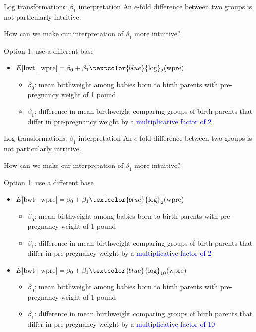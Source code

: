 \documentclass[10pt,t]{beamer}
\begin{document}
\begin{frame}{Log transformations: $\beta_1$ interpretation}
An $e$-fold difference between two groups is not particularly intuitive.

How can we make our interpretation of $\beta_1$ more intuitive?

\vspace{0.3cm}

Option 1: use a different base

\begin{itemize}
	\item $E[\text{bwt} \mid \text{wpre}] = \beta_0 + \beta_1 \textcolor{blue}{\text{log}}_2 (\text{wpre})$
	\begin{itemize}
		\item $\beta_0$: mean birthweight among babies born to birth parents with pre-pregnancy weight of 1 pound
		\item $\beta_1$: difference in mean birthweight comparing groups of birth parents that differ in pre-pregnancy weight by a \textcolor{blue}{multiplicative factor of 2}
	\end{itemize} 
\end{itemize}
\end{frame}

\begin{frame}{Log transformations: $\beta_1$ interpretation}
An $e$-fold difference between two groups is not particularly intuitive.

How can we make our interpretation of $\beta_1$ more intuitive?

\vspace{0.3cm}

Option 1: use a different base

\begin{itemize}
	\item $E[\text{bwt} \mid \text{wpre}] = \beta_0 + \beta_1 \textcolor{blue}{\text{log}}_2 (\text{wpre})$
	\begin{itemize}
		\item $\beta_0$: mean birthweight among babies born to birth parents with pre-pregnancy weight of 1 pound
		\item $\beta_1$: difference in mean birthweight comparing groups of birth parents that differ in pre-pregnancy weight by a \textcolor{blue}{multiplicative factor of 2}
	\end{itemize} 
\item $E[\text{bwt} \mid \text{wpre}] = \beta_0 + \beta_1 \textcolor{blue}{\text{log}}_{10} (\text{wpre})$
\begin{itemize}
	\item $\beta_0$: mean birthweight among babies born to birth parents with pre-pregnancy weight of 1 pound
	\item $\beta_1$: difference in mean birthweight comparing groups of birth parents that differ in pre-pregnancy weight by a \textcolor{blue}{multiplicative factor of 10}
\end{itemize} 
\end{itemize}
\end{frame}
\end{document}
